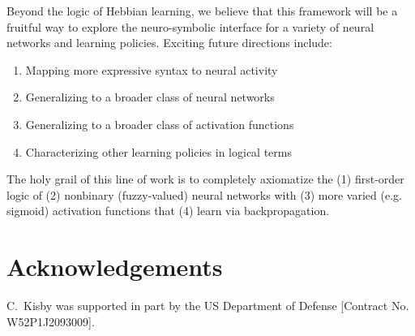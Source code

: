 \documentclass[letterpaper]{article}
\theoremstyle{definition}
\newcommand{\proves}{\vdash}
\newcommand{\orr}{\vee}
\begin{document}

Beyond the logic of Hebbian learning, we believe that this framework will be a fruitful way to explore the neuro-symbolic interface for a variety of neural networks and learning policies.  Exciting future directions include:
\begin{enumerate}[itemsep=-1pt, topsep=2pt]
    \item Mapping more expressive syntax to neural activity
    \item Generalizing to a broader class of neural networks
    \item Generalizing to a broader class of activation functions
    \item Characterizing other learning policies in logical terms
\end{enumerate}
The holy grail of this line of work is to completely axiomatize the (1) first-order logic of (2) nonbinary (fuzzy-valued) neural networks with (3) more varied (e.g. sigmoid) activation functions that (4) learn via backpropagation.

\section{Acknowledgements} C.~Kisby was supported in part by the US Department of Defense [Contract No. W52P1J2093009].



\end{document}
